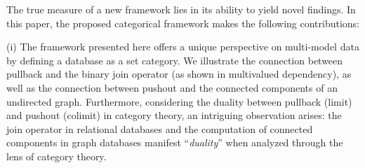 







The true measure of a new framework lies in its ability to yield novel findings. In this paper, the proposed categorical framework makes the following  contributions:

(i)  The framework presented here offers a unique perspective on multi-model data by defining a database as a set category. We illustrate the connection between pullback and the binary join operator (as shown in multivalued dependency), as well as the connection between pushout and the connected components of an undirected graph. Furthermore, considering the duality between pullback (limit) and pushout (colimit) in category theory, an intriguing observation arises: the join operator in relational databases and the computation of connected components in graph databases manifest ``\textit{duality}''  when analyzed through the lens of category theory.

 




